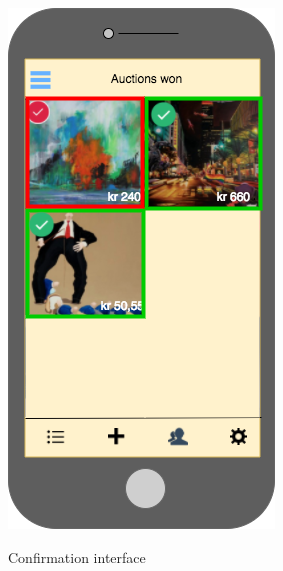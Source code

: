 \begin{figure}[H]
  \hspace{1cm}
  \begin{minipage}[b]{0.31\linewidth}
    \caption{\newline Confirmation interface}
    \includegraphics[width=\linewidth]{Appendix/HorizontalPrototype/4.png}
    \label{ConfirmationInterface}
  \end{minipage}
\end{figure}

